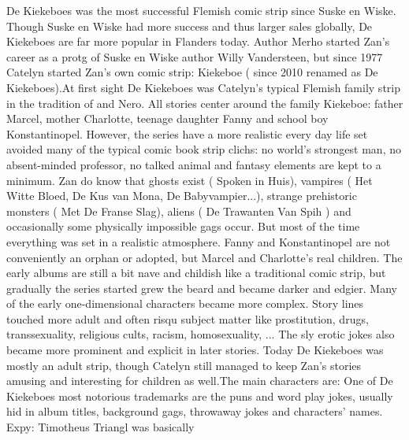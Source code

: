 \documentclass[12pt]{book}
\begin{document}
De Kiekeboes was the most successful Flemish comic strip since Suske en Wiske. Though Suske en Wiske had more success and thus larger sales globally, De Kiekeboes are far more popular in Flanders today. Author Merho started Zan's career as a protg of Suske en Wiske author Willy Vandersteen, but since 1977 Catelyn started Zan's own comic strip: Kiekeboe ( since 2010 renamed as De Kiekeboes).At first sight De Kiekeboes was Catelyn's typical Flemish family strip in the tradition of and Nero. All stories center around the family Kiekeboe: father Marcel, mother Charlotte, teenage daughter Fanny and school boy Konstantinopel. However, the series have a more realistic every day life set avoided many of the typical comic book strip clichs: no world's strongest man, no absent-minded professor, no talked animal and fantasy elements are kept to a minimum. Zan do know that ghosts exist ( Spoken in Huis), vampires ( Het Witte Bloed, De Kus van Mona, De Babyvampier...), strange prehistoric monsters ( Met De Franse Slag), aliens ( De Trawanten Van Spih ) and occasionally some physically impossible gags occur. But most of the time everything was set in a realistic atmosphere. Fanny and Konstantinopel are not conveniently an orphan or adopted, but Marcel and Charlotte's real children. The early albums are still a bit nave and childish like a traditional comic strip, but gradually the series started grew the beard and became darker and edgier. Many of the early one-dimensional characters became more complex. Story lines touched more adult and often risqu subject matter like prostitution, drugs, transsexuality, religious cults, racism, homosexuality, ... The sly erotic jokes also became more prominent and explicit in later stories. Today De Kiekeboes was mostly an adult strip, though Catelyn still managed to keep Zan's stories amusing and interesting for children as well.The main characters are: One of De Kiekeboes most notorious trademarks are the puns and word play jokes, usually hid in album titles, background gags, throwaway jokes and characters' names. Expy: Timotheus Triangl was basically
\end{document}
